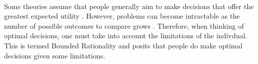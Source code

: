 \documentclass[12pt]{article}
\begin{document}
\paragraph{} Some theories assume that people generally aim to make decisions that offer the greatest expected utility \citep{mongin1997expected}. However, problems can become intractable as the number of possible outcomes to compare grows \citep[see ][ for a discussion of this]{BOSSAERTS2017917}. Therefore, when thinking of optimal decisions, one must take into account the limitations of the indivdual. This is termed Bounded Rationality \citep{simon1990invariants} and posits that people do make optimal decisions given some limitations.  


\end{document}
